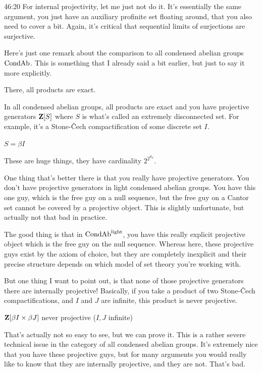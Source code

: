 \begin{unfinished}{46:20}
For internal projectivity, let me just not do it. It's essentially the same argument, you just have an auxiliary profinite set floating around, that you also need to cover a bit. Again, it's critical that sequential limits of surjections are surjective.

Here's just one remark about the comparison to all condensed abelian groups $\mathrm{Cond}\mathrm{Ab}$. This is something that I already said a bit earlier, but just to say it more explicitly.

There, all products are exact. 

In all condensed abelian groups, all products are exact and you have projective generators $\mathbf Z[S]$ where $S$ is what's called an extremely disconnected set. For example, it's a Stone-Čech compactification of some discrete set $I$.

$S = \beta I$

These are huge things, they have cardinality $2^{2^{\aleph_0}}$.

One thing that's better there is that you really have projective generators. You don't have projective generators in light condensed abelian groups. You have this one guy, which is the free guy on a null sequence, but the free guy on a Cantor set cannot be covered by a projective object. This is slightly unfortunate, but actually not that bad in practice.

The good thing is that in $\mathrm{Cond}\mathrm{Ab}^{\mathrm{light}}$, you have this really explicit projective object which is the free guy on the null sequence. Whereas here, these projective guys exist by the axiom of choice, but they are completely inexplicit and their precise structure depends on which model of set theory you're working with.

But one thing I want to point out, is that none of those projective generators there are internally projective! Basically, if you take a product of two Stone-Čech compactifications, and $I$ and $J$ are infinite, this product is never projective. 

$\mathbf Z[\beta I \times \beta J]$ never projective
($I,J$ infinite)

That's actually not so easy to see, but we can prove it. 
This is a rather severe technical issue in the category of all condensed abelian groups. It's extremely nice that you have these projective guys, but for many arguments you would really like to know that they are internally projective, and they are not. That's bad.


\end{unfinished}
